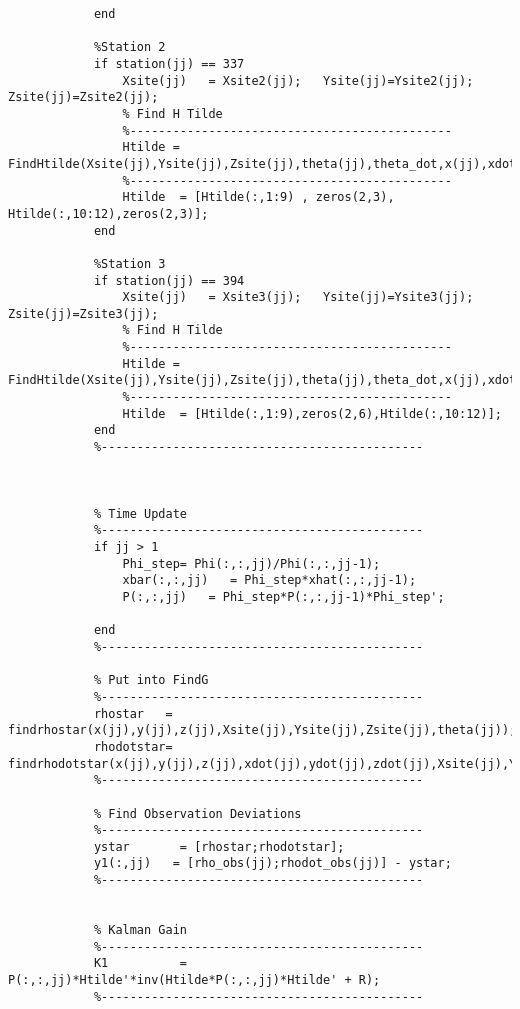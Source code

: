 \documentclass[]{article}
\begin{document}
\begin{appendix}
\begin{lstlisting}
	        end
	
	        %Station 2
	        if station(jj) == 337
	            Xsite(jj)   = Xsite2(jj);   Ysite(jj)=Ysite2(jj);   Zsite(jj)=Zsite2(jj);
	            % Find H Tilde
	            %---------------------------------------------
	            Htilde = FindHtilde(Xsite(jj),Ysite(jj),Zsite(jj),theta(jj),theta_dot,x(jj),xdot(jj),y(jj),ydot(jj),z(jj),zdot(jj));
	            %---------------------------------------------
	            Htilde  = [Htilde(:,1:9) , zeros(2,3), Htilde(:,10:12),zeros(2,3)];
	        end
	
	        %Station 3
	        if station(jj) == 394
	            Xsite(jj)   = Xsite3(jj);   Ysite(jj)=Ysite3(jj);   Zsite(jj)=Zsite3(jj);
	            % Find H Tilde
	            %---------------------------------------------
	            Htilde = FindHtilde(Xsite(jj),Ysite(jj),Zsite(jj),theta(jj),theta_dot,x(jj),xdot(jj),y(jj),ydot(jj),z(jj),zdot(jj));
	            %---------------------------------------------
	            Htilde  = [Htilde(:,1:9),zeros(2,6),Htilde(:,10:12)];
	        end
	        %---------------------------------------------
	        
	        
	        
	        % Time Update
	        %---------------------------------------------
	        if jj > 1
	            Phi_step= Phi(:,:,jj)/Phi(:,:,jj-1);
	            xbar(:,:,jj)   = Phi_step*xhat(:,:,jj-1);
	            P(:,:,jj)   = Phi_step*P(:,:,jj-1)*Phi_step';
	            
	        end
	        %---------------------------------------------
	        
	        % Put into FindG
	        %---------------------------------------------
	        rhostar   = findrhostar(x(jj),y(jj),z(jj),Xsite(jj),Ysite(jj),Zsite(jj),theta(jj));
	        rhodotstar= findrhodotstar(x(jj),y(jj),z(jj),xdot(jj),ydot(jj),zdot(jj),Xsite(jj),Ysite(jj),Zsite(jj),theta(jj),theta_dot,rhostar);
	        %---------------------------------------------
	        
	        % Find Observation Deviations
	        %---------------------------------------------
	        ystar       = [rhostar;rhodotstar];
	        y1(:,jj)   = [rho_obs(jj);rhodot_obs(jj)] - ystar;
	        %---------------------------------------------
	        
	        
	        % Kalman Gain
	        %---------------------------------------------
	        K1          = P(:,:,jj)*Htilde'*inv(Htilde*P(:,:,jj)*Htilde' + R);
	        %---------------------------------------------
	        

\end{lstlisting}
\end{appendix}
\end{document}
